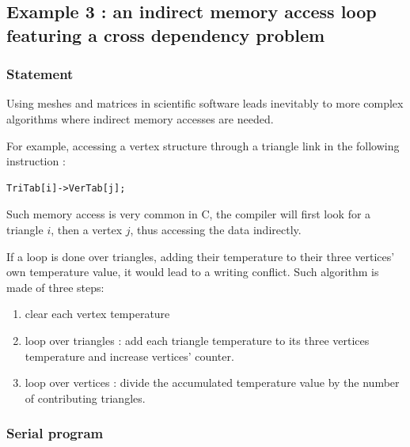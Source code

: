 \documentclass[a4paper,12pt]{article}
\begin{document}
\subsection{Example 3 : an indirect memory access loop featuring a cross dependency problem}

\subsubsection{Statement}

Using meshes and matrices in scientific software leads inevitably to more complex algorithms where indirect memory accesses are needed.

For example, accessing a vertex structure through a triangle link in the following instruction :

\begin{tt}
\begin{verbatim}
TriTab[i]->VerTab[j];
\end{verbatim}
\end{tt}
\normalfont

Such memory access is very common in C, the compiler will first look for a triangle $i$, then a vertex $j$, thus accessing the data indirectly.

If a loop is done over triangles, adding their temperature to their three vertices' own temperature value, it would lead to a writing conflict. Such algorithm is made of three steps:

\begin{enumerate}
	\item clear each vertex temperature
	\item loop over triangles : add each triangle temperature to its three vertices temperature and increase vertices' counter.
	\item loop over vertices : divide the accumulated temperature value by the number of contributing triangles.
\end{enumerate}

\subsubsection{Serial program}
\end{document}
